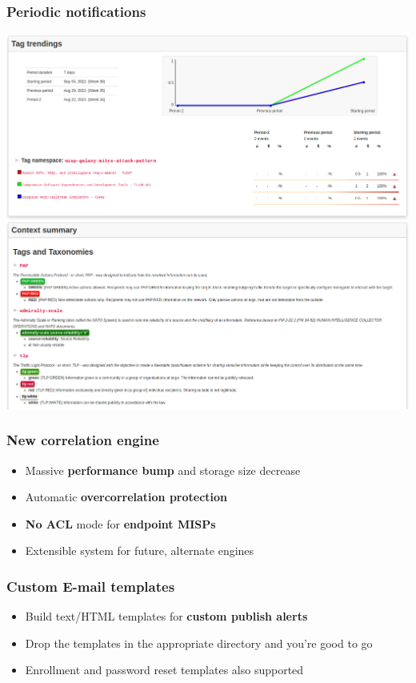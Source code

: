 \begin{frame}
\frametitle{Periodic notifications}
\includegraphics[scale=0.2]{images/periodic.png}
\end{frame}

\begin{frame}
  \frametitle{New correlation engine}
  \begin{itemize}
     \item Massive {\bf performance bump} and storage size decrease
     \item Automatic {\bf overcorrelation protection}
     \item {\bf No ACL} mode for {\bf endpoint MISPs}
     \item Extensible system for future, alternate engines
  \end{itemize}
\end{frame}

\begin{frame}
  \frametitle{Custom E-mail templates}
  \begin{itemize}
     \item Build text/HTML templates for {\bf custom publish alerts}
     \item Drop the templates in the appropriate directory and you're good to go
     \item Enrollment and password reset templates also supported
  \end{itemize}
\end{frame}

